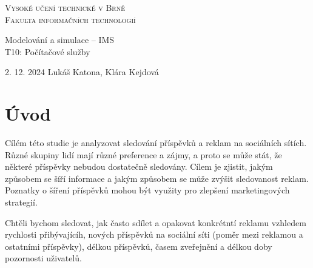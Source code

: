 \documentclass[11pt, a4paper]{article}
\begin{document}
\begin{titlepage}
    \begin{center}
        \textsc{\Huge Vysoké učení technické v Brně\\\vspace{0.5em}\huge Fakulta informačních technologií}
        
        {\LARGE Modelování a simulace -- IMS\\\vspace{0.5em}}
        {\Huge T10: Počítačové služby}
        
    \end{center}
    {\Large 2. 12. 2024 \hfill Lukáš Katona, Klára Kejdová}
\end{titlepage}

\newpage

\section{Úvod}

Cílém této studie je analyzovat sledování příspěvků a reklam na sociálních sítích.
Různé skupiny lidí mají různé preference a zájmy, a proto se může stát,
že některé příspěvky nebudou dostatečně sledovány. Cílem je zjistit,
jakým způsobem se šíří informace a jakým způsobem se může zvýšit sledovanost reklam. 
Poznatky o šíření příspěvků mohou být využity pro zlepšení marketingových strategií.


Chtěli bychom sledovat, jak často sdílet a opakovat konkrétntí reklamu vzhledem rychlosti přibývajícíh, nových příspěvků na sociální síti
(poměr mezi reklamou a ostatními příspěvky), délkou příspěvků, časem zveřejnění a délkou doby pozornosti uživatelů.
\end{document}

